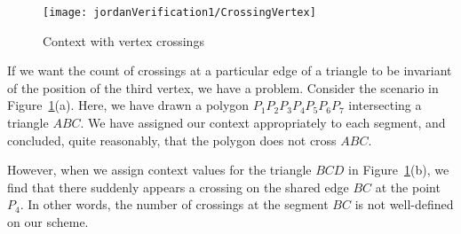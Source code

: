 \begin{figure}
\centering\texttt{[image: jordanVerification1/CrossingVertex]}
\caption{Context with vertex crossings}
\label{fig:CrossingVertex}
\end{figure}

If we want the count of crossings at a particular edge of a triangle to be invariant of the position of the third vertex, we have a problem. Consider the scenario in Figure~\ref{fig:CrossingVertex}(a). Here, we have drawn a polygon $P_1P_2P_3P_4P_5P_6P_7$ intersecting a triangle $ABC$. We have assigned our context appropriately to each segment, and concluded, quite reasonably, that the polygon does not cross $ABC$. 

However, when we assign context values for the triangle $BCD$ in Figure~\ref{fig:CrossingVertex}(b), we find that there suddenly appears a crossing on the shared edge $BC$ at the point $P_4$. In other words, the number of crossings at the segment $BC$ is not well-defined on our scheme.







